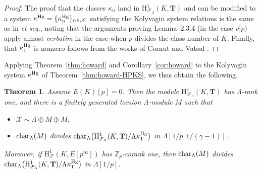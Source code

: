 \documentclass[10pt]{amsart}
\numberwithin{equation}{section}
\newtheorem{theorem}{Theorem}
\theoremstyle{definition}
\theoremstyle{remark}
\newcommand{\Z}{\mathbb{Z}}
\newcommand{\cN}{\mathscr{N}}
\newcommand{\Fcal}{\mathcal{F}}
\newcommand{\rH}{\mathrm{H}}
\newcommand{\CF}{\mathcal{F}}
\begin{document}
\begin{proof}
The proof that the classes  $\kappa_n$ land in $\rH^1_{\Fcal_\Lambda}(K,\mathbf{T})$ and can be modified to a system $\kappa^{\rm Hg}=\{\kappa_n^{\rm Hg}\}_{n\in\cN}$ satisfying the Kolyvagin system relations is the same as in \cite[Lem.~2.3.4]{howard} \emph{et seq.}, noting that the arguments proving Lemma~2.3.4 (in the case $v\vert p$) apply almost \emph{verbatim} in the case when $p$ divides the class number of $K$. Finally, that $\kappa_1^{\rm Hg}$ is nonzero follows from the works of Cornut and Vatsal \cite{cornut, vatsal}.
\end{proof}

Applying Theorem~\ref{thm:howard} and Corollary~\ref{cor:howard} to the Kolyvagin system $\kappa^{\rm Hg}$ of Theorem~\ref{thm:howard-HPKS}, we thus obtain the following.

\begin{theorem}\label{thm:howard-HP}
Assume $E(K)[p]=0$. Then the module $\rH^1_{\Fcal_\Lambda}(K,\mathbf{T})$ has $\Lambda$-rank one, and there is a finitely generated torsion $\Lambda$-module $M$ such that
\begin{itemize}
\item[(i)] $\mathcal{X}\sim\Lambda\oplus M\oplus M$,
\item[(ii)] ${\rm char}_\Lambda(M)$ divides ${\rm char}_\Lambda\bigl(\rH^1_{\Fcal_\Lambda}(K,\mathbf{T})/\Lambda\kappa_1^{\rm Hg}\bigr)$ in $\Lambda[1/p,1/(\gamma-1)]$.
\end{itemize}
Moreover, if $\rH^1_{\CF}(K,E[p^\infty])$ has $\Z_p$-corank one,  then ${\rm char}_\Lambda(M)$ divides ${\rm char}_\Lambda\bigl(\rH^1_{\Fcal_\Lambda}(K,\mathbf{T})/\Lambda\kappa_1^{\rm Hg}\bigr)$ in $\Lambda[1/p]$.
\end{theorem}
\end{document}
